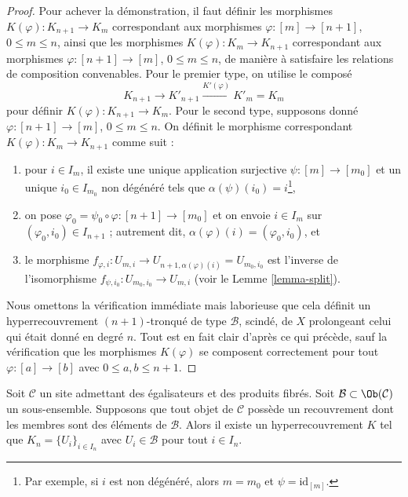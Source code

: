 \begin{proof}
\medskip\noindent
Pour achever la démonstration, il faut définir les morphismes
$K(\varphi) : K_{n + 1} \to K_m$ correspondant aux morphismes
$\varphi : [m] \to [n + 1]$, $0 \leq m \leq n$, ainsi que les morphismes
$K(\varphi) : K_m \to K_{n + 1}$ correspondant aux morphismes
$\varphi : [n + 1] \to [m]$, $0 \leq m \leq n$,
de manière à satisfaire les relations de composition convenables.
Pour le premier type, on utilise le composé
$$
K_{n + 1} \to K'_{n + 1} \xrightarrow{K'(\varphi)} K'_m = K_m
$$
pour définir $K(\varphi) : K_{n + 1} \to K_m$.
Pour le second type, supposons donné $\varphi : [n + 1] \to [m]$,
$0 \leq m \leq n$. On définit le morphisme correspondant
$K(\varphi) : K_m \to K_{n + 1}$ comme suit :
\begin{enumerate}
\item pour $i \in I_m$, il existe une unique application surjective
$\psi : [m] \to [m_0]$ et un unique $i_0 \in I_{m_0}$ non dégénéré
tels que $\alpha(\psi)(i_0) = i$\footnote{Par exemple, si $i$ est
non dégénéré, alors $m = m_0$ et $\psi = \text{id}_{[m]}$.},
\item on pose $\varphi_0 = \psi_0 \circ \varphi : [n + 1] \to [m_0]$
et on envoie
$i \in I_m$ sur $(\varphi_0, i_0) \in I_{n + 1}$ ; autrement dit,
$\alpha(\varphi)(i) = (\varphi_0, i_0)$, et
\item le morphisme
$f_{\varphi, i} : U_{m, i} \to U_{n + 1, \alpha(\varphi)(i)} = U_{m_0, i_0}$
est l'inverse de l'isomorphisme $f_{\psi, i_0} : U_{m_0, i_0} \to U_{m, i}$
(voir le Lemme \ref{lemma-split}).
\end{enumerate}
Nous omettons la vérification immédiate mais laborieuse que cela définit
un hyperrecouvrement $(n + 1)$-tronqué de type $\mathcal{B}$, scindé, de $X$
prolongeant celui qui était donné en degré $n$. Tout est en fait clair
d'après ce qui précède, sauf la vérification que les morphismes
$K(\varphi)$ se composent correctement pour tout $\varphi : [a] \to [b]$
avec $0 \leq a, b \leq n + 1$.
\end{proof}

\begin{lemma}
\label{lemma-hypercovering-site}
Soit $\mathcal{C}$ un site admettant des égalisateurs et des produits fibrés.
Soit $\mathcal{B} \subset \Ob(\mathcal{C})$ un sous-ensemble. Supposons
que tout objet de $\mathcal{C}$ possède un recouvrement
dont les membres sont des éléments de $\mathcal{B}$.
Alors il existe un hyperrecouvrement $K$ tel que
$K_n = \{U_i\}_{i \in I_n}$ avec $U_i \in \mathcal{B}$
pour tout $i \in I_n$.
\end{lemma}

